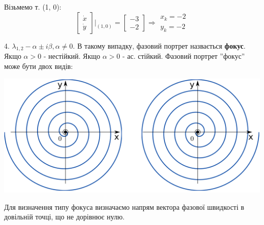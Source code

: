 \begin{example}
Візьмемо т. (1, 0):
$$
\begin{bmatrix}
 \dot{x} \\
 \dot{y}
\end{bmatrix} \Bigg|_{(1,0)} = \begin{bmatrix}
 -3 \\
 -2
\end{bmatrix} \Longrightarrow \begin{gathered}
 x_k = -2 \\
 y_k = -2
\end{gathered}
$$

\end{example}

4. $\lambda_{1, 2} - \alpha \pm i\beta, \alpha\neq 0$. В такому випадку, фазовий портрет назвається \textbf{фокус}. Якщо $ \alpha > 0$ - нестійкий. Якщо $ \alpha > 0$ - ас. стійкий.
Фазовий портрет ''фокус'' може бути двох видів:
\begin{center} \includegraphics[scale=0.3]{assets/lectures_recent-9fe11a21.png} \end{center}
Для визначення типу фокуса визначаємо напрям вектора фазової швидкості в довільній точці, що не дорівнює нулю.

